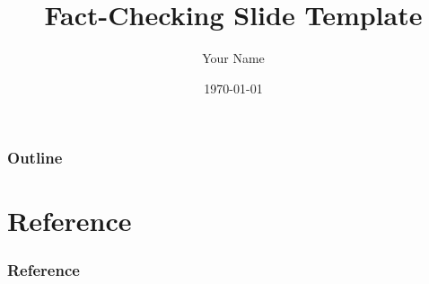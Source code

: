 \documentclass[aspectratio=169,10pt]{beamer}
\title[Fact-Checking Slides]{\large\textbf{Fact-Checking Slide Template}}
\author[Your Name]{Your Name \inst{1}}
\institute[]{
\inst{1}Your University or Organization
}
\date{\today}
\begin{document}
\begin{frame}
    \titlepage
\end{frame}

\begin{frame}[t,allowframebreaks]
    \frametitle{Outline}
    \tableofcontents
\end{frame}



\section*{Reference}
\begin{frame}[t,allowframebreaks]
    \footnotesize
    \frametitle{Reference}
    
\end{frame}
\end{document}
